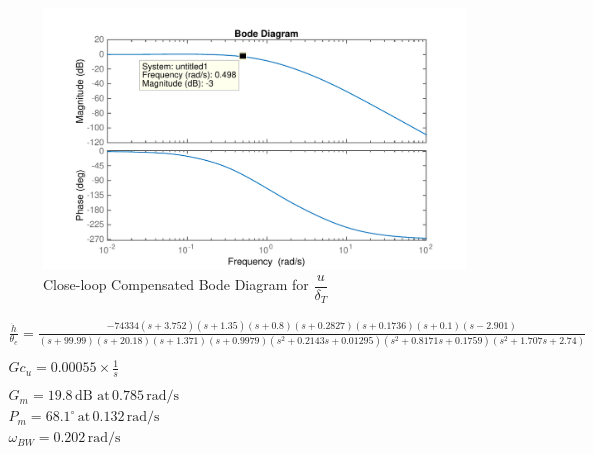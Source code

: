 \documentclass[11pt]{article}
\begin{document}
\begin{figure}[h!]
\begin{center}
\includegraphics[height=.4\textheight]{figures/close_comp_u}
\caption{Close-loop Compensated Bode Diagram for $\dfrac{u}{\delta_T}$}
\end{center}
\end{figure}

\begin{gather*}
\frac{\dot{h}}{\theta_e}=\frac{-74334 (s+3.752) (s+1.35) (s+0.8) (s+0.2827) (s+0.1736) (s+0.1) (s-2.901)}{(s+99.99) (s+20.18) (s+1.371) (s+0.9979) (s^2 + 0.2143s + 0.01295) (s^2 + 0.8171s + 0.1759) (s^2 + 1.707s + 2.74)} \\
\\
\boxed{Gc_{u} = 0.00055 \times \frac{1}{s}} \\
\\
G_m=19.8\,\mathrm{dB\,\, at\,} 0.785 \,\mathrm{rad/s}  \\
P_m=68.1^{\circ}\, \mathrm{at}\, 0.132 \,\mathrm{rad/s} \\
\omega_{BW}=0.202\, \mathrm{rad/s}\\
\end{gather*}
\end{document}
